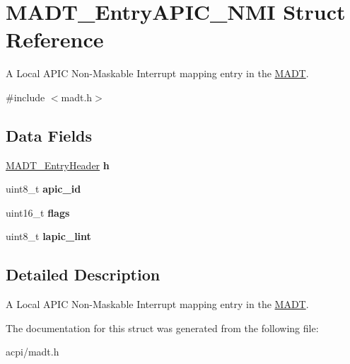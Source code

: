 \hypertarget{structMADT__EntryAPIC__NMI}{}\section{M\+A\+D\+T\+\_\+\+Entry\+A\+P\+I\+C\+\_\+\+N\+MI Struct Reference}
\label{structMADT__EntryAPIC__NMI}


A Local A\+P\+IC Non-\/\+Maskable Interrupt mapping entry in the \hyperlink{structMADT}{M\+A\+DT}.  




{\ttfamily \#include $<$madt.\+h$>$}

\subsection*{Data Fields}
\begin{DoxyCompactItemize}
\item 
\hyperlink{structMADT__EntryHeader}{M\+A\+D\+T\+\_\+\+Entry\+Header} {\bfseries h}\hypertarget{structMADT__EntryAPIC__NMI_aa26e0d8ef429e66cb8b2528c9c44ae57}{}\label{structMADT__EntryAPIC__NMI_aa26e0d8ef429e66cb8b2528c9c44ae57}

\item 
uint8\+\_\+t {\bfseries apic\+\_\+id}\hypertarget{structMADT__EntryAPIC__NMI_ab71faf05d719d04288bc124d7db105d5}{}\label{structMADT__EntryAPIC__NMI_ab71faf05d719d04288bc124d7db105d5}

\item 
uint16\+\_\+t {\bfseries flags}\hypertarget{structMADT__EntryAPIC__NMI_a69168d093457853abeeb22a88190ec9a}{}\label{structMADT__EntryAPIC__NMI_a69168d093457853abeeb22a88190ec9a}

\item 
uint8\+\_\+t {\bfseries lapic\+\_\+lint}\hypertarget{structMADT__EntryAPIC__NMI_af499d1c4c041a1403aa8f4bc318905d3}{}\label{structMADT__EntryAPIC__NMI_af499d1c4c041a1403aa8f4bc318905d3}

\end{DoxyCompactItemize}


\subsection{Detailed Description}
A Local A\+P\+IC Non-\/\+Maskable Interrupt mapping entry in the \hyperlink{structMADT}{M\+A\+DT}. 

The documentation for this struct was generated from the following file\+:\begin{DoxyCompactItemize}
\item 
acpi/madt.\+h\end{DoxyCompactItemize}
